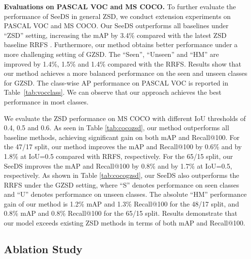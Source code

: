\noindent\textbf{Evaluations on PASCAL VOC and MS COCO.}
To further evaluate the performance of SeeDS in general ZSD, we conduct extension experiments on PASCAL VOC and MS COCO. Our SeeDS outperforms all baselines under ``ZSD'' setting, increasing the mAP by 3.4\% compared with the latest ZSD baseline RRFS \cite{huang2022robust}. Furthermore, our method obtains better performance under a more challenging setting of GZSD. The ``Seen'', ``Unseen'' and ``HM'' are improved by 1.4\%, 1.5\% and 1.4\% compared with the RRFS. Results show that our method achieves a more balanced performance on the seen and unseen classes for GZSD. The class-wise AP performance on PASCAL VOC is reported in Table~\ref{tab:vocclass}. We can observe that our approach achieves the best performance in most classes.

We evaluate the ZSD performance on MS COCO with different IoU thresholds of 0.4, 0.5 and 0.6. As seen in Table \ref{tab:cocozsd}, our method outperforms all baseline methods, achieving significant gain on both mAP and Recall@100. For the 47/17 split, our method improves the mAP and Recall@100 by 0.6\% and by 1.8\% at IoU=0.5 compared with RRFS, respectively. For the 65/15 split, our SeeDS improves the mAP and Recall@100 by 0.8\% and by 1.7\% at IoU=0.5, respectively. As shown in Table \ref{tab:cocogzsd}, our SeeDS also outperforms the RRFS under the GZSD setting, where ``S'' denotes performance on seen classes and ``U'' denotes performance on unseen classes. The absolute ``HM'' performance gain of our method is 1.2\% mAP and 1.3\% Recall@100 for the 48/17 split, and 0.8\% mAP and 0.8\% Recall@100 for the 65/15 split. Results demonstrate that our model exceeds existing ZSD methods in terms of both mAP and Recall@100.

\subsection{Ablation Study}
\label{sec:ablation}

